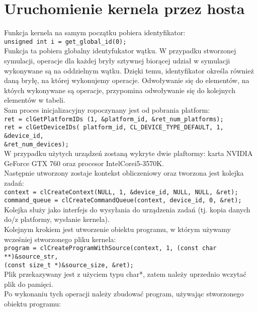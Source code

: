 \section{Uruchomienie kernela przez hosta}
Funkcja kernela na samym początku pobiera identyfikator: \\
\centering\verb+unsigned int i = get_global_id(0);+\\\flushleft
Funkcja ta pobiera globalny identyfukator wątku. W przypadku stworzonej symulacji, operacje dla każdej bryły sztywnej biorącej udział w symulacji wykonywane są na oddzielnym wątku. Dzięki temu, identyfikator określa również daną bryłę, na której wykonujemy operacje. Odwoływanie się do elementów, na któych wykonywane są operacje, przypomina odwoływanie się do kolejnych elementów w tabeli. \\
Sam proces inicjalizacyjny ropoczynany jest od pobrania platform:\\
\centering\verb+ret = clGetPlatformIDs (1, &platform_id, &ret_num_platforms);+\\
\verb+ret = clGetDeviceIDs( platform_id, CL_DEVICE_TYPE_DEFAULT, 1, &device_id,+ \\
\verb+&ret_num_devices);+\\ \flushleft
W przypadku użytych urządzeń zostaną wykryte dwie plaftormy: karta NVIDIA GeForce GTX 760 oraz procesor Intel\textregistered Core\texttrademark i5-3570K. \\ 
Następnie utworzony zostaje kontekst obliczeniowy oraz tworzona jest kolejka zadań:\\
\centering\verb+context = clCreateContext(NULL, 1, &device_id, NULL, NULL, &ret);+\\
\verb+command_queue = clCreateCommandQueue(context, device_id, 0, &ret);+\\\flushleft
Kolejka służy jako interfejs do wysyłania do urządzenia zadań (tj. kopia danych do/z platformy, wysłanie kernela). \\
Kolejnym krokiem jest utworzenie obiektu programu, w którym używamy wcześniej stworzonego pliku kernela:\\
\centering\verb+program = clCreateProgramWithSource(context, 1, (const char **)&source_str,+\\
\verb+(const size_t *)&source_size, &ret);+\\\flushleft
Plik przekazywany jest z użyciem typu char*, zatem należy uprzednio wczytać plik do pamięci. \\
Po wykonaniu tych operacji należy zbudować program, używając stworzonego obiektu programu:\\
